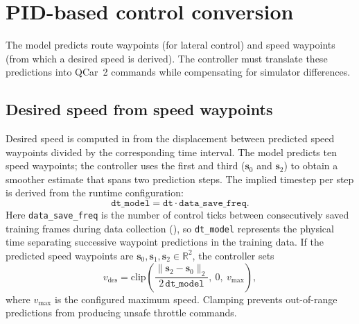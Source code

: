 \section{PID-based control conversion}
\label{sec:pid-conversion}
The model predicts route waypoints (for lateral control) and speed waypoints (from which a desired speed is derived). The controller must translate these predictions into QCar~2 commands while compensating for simulator differences.

\subsection{Desired speed from speed waypoints}
\label{sec:desired-speed}
Desired speed is computed in  from the displacement between predicted speed waypoints divided by the corresponding time interval. The model predicts ten speed waypoints; the controller uses the first and third ($\mathbf{s}_0$ and $\mathbf{s}_2$) to obtain a smoother estimate that spans two prediction steps. The implied timestep per step is derived from the runtime configuration:
\begin{equation}
\texttt{dt\_model} = \texttt{dt} \cdot \texttt{data\_save\_freq}.
\end{equation}
Here \texttt{data\_save\_freq} is the number of control ticks between consecutively saved training frames during data collection (), so \texttt{dt\_model} represents the physical time separating successive waypoint predictions in the training data.
If the predicted speed waypoints are $\mathbf{s}_0,\mathbf{s}_1,\mathbf{s}_2\in\mathbb{R}^2$, the controller sets
\begin{equation}
 v_{\text{des}} = \mathrm{clip}\!\left( \frac{\lVert \mathbf{s}_2-\mathbf{s}_0\rVert_2}{2\,\texttt{dt\_model}},\ 0,\ v_{\max}\right),
\end{equation}
where $v_{\max}$ is the configured maximum speed. Clamping prevents out-of-range predictions from producing unsafe throttle commands.

